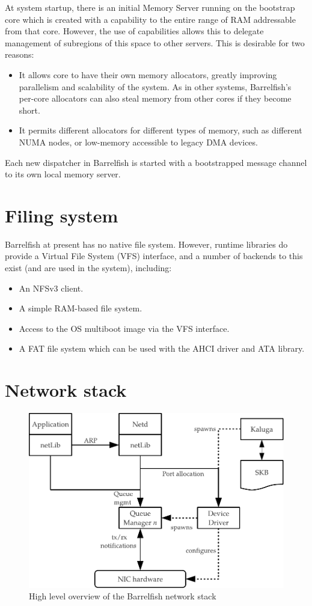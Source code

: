 \documentclass[a4paper,twoside]{report} %
\begin{document}
At system startup, there is an initial Memory Server running on the
bootstrap core which is created with a capability to the entire range
of RAM addressable from that core.  However, the use of capabilities
allows this to delegate management of subregions of this space to
other servers.  This is desirable for two reasons:
\begin{itemize}
\item It allows core to have their own memory allocators, greatly
  improving parallelism and scalability of the system. As in other
  systems, Barrelfish's per-core allocators can also steal memory from
  other cores if they become short. 
\item It permits different allocators for different types of memory,
  such as different NUMA nodes, or low-memory accessible to legacy DMA
  devices.
\end{itemize}

Each new dispatcher in Barrelfish is started with a bootstrapped
message channel to its own local memory server. 

\section{Filing system}

Barrelfish at present has no native file system.  However, runtime
libraries do provide a Virtual File System (VFS) interface, and a
number of backends to this exist (and are used in the system),
including:
\begin{itemize}
\item An NFSv3 client.
\item A simple RAM-based file system.
\item Access to the OS multiboot image via the VFS interface.
\item A FAT file system which can be used with the AHCI driver and ATA
  library. 
\end{itemize}

\section{Network stack}

\begin{figure}[hbt]
 \begin{center}
 \includegraphics[width=0.7\columnwidth]{net-arch.pdf}
 \end{center}
 \caption{High level overview of the Barrelfish network stack}\label{fig:net-arch}
\end{figure}
\end{document}
